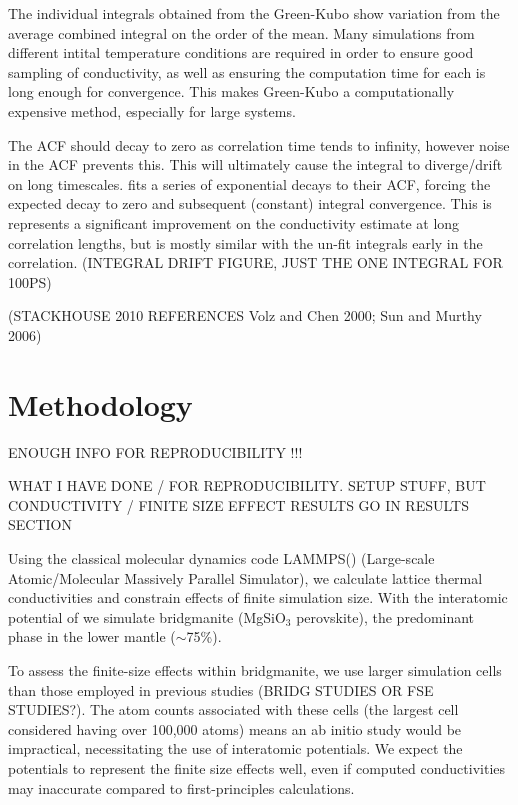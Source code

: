 \documentclass[%
preprint,                                  %
nofootinbib,
 amsmath,amssymb,
 aps,
]{revtex4-1}
\begin{document}
The individual integrals obtained from the Green-Kubo show variation from the average combined integral on the order of the mean. Many simulations from different intital temperature conditions are required in order to ensure good sampling of conductivity, as well as ensuring the computation time for each is long enough for convergence. This makes Green-Kubo a computationally expensive method, especially for large systems.

The ACF should decay to zero as correlation time tends to infinity, however noise in the ACF prevents this. This will ultimately cause the integral to diverge/drift on long timescales. \citet{Howell2012} fits a series of exponential decays to their ACF, forcing the expected decay to zero and subsequent (constant) integral convergence. This is represents a significant improvement on the conductivity estimate at long correlation lengths, but is mostly similar with the un-fit integrals early in the correlation. (INTEGRAL DRIFT FIGURE, JUST THE ONE INTEGRAL FOR 100PS)

(STACKHOUSE 2010 REFERENCES Volz and Chen 2000; Sun and Murthy 2006)





\section{\label{sec:methodology}Methodology}

ENOUGH INFO FOR REPRODUCIBILITY !!!

WHAT I HAVE DONE / FOR REPRODUCIBILITY. SETUP STUFF, BUT CONDUCTIVITY / FINITE SIZE EFFECT RESULTS GO IN RESULTS SECTION


Using the classical molecular dynamics code LAMMPS(\citet{Plimpton1995}) (Large-scale Atomic/Molecular Massively Parallel Simulator), we calculate lattice thermal conductivities and constrain effects of finite simulation size. With the interatomic potential of \citet{Oganov2000} we simulate bridgmanite (MgSiO$_3$ perovskite), the predominant phase in the lower mantle ($\sim$75\%). 

To assess the finite-size effects within bridgmanite, we use larger simulation cells than those employed in previous studies (BRIDG STUDIES OR FSE STUDIES?). The atom counts associated with these cells (the largest cell considered having over 100,000 atoms) means an ab initio study would be impractical, necessitating the use of interatomic potentials. We expect the potentials to represent the finite size effects well, even if computed conductivities may inaccurate compared to first-principles calculations.
\end{document}

